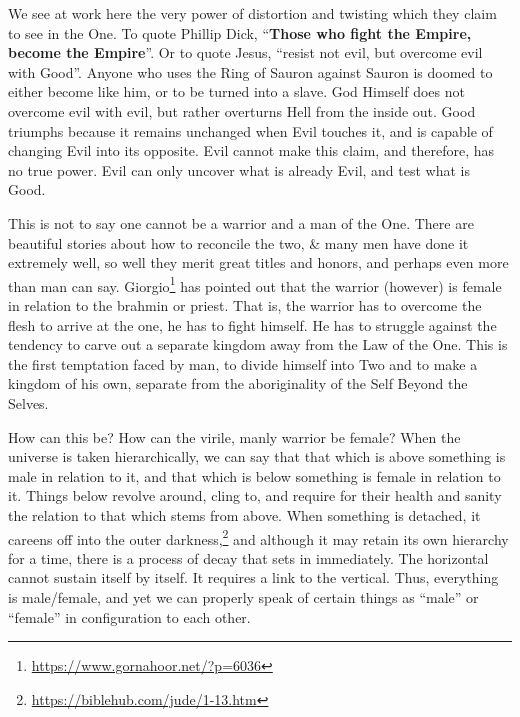 We see at work here the very power of distortion and twisting which they claim to see in the One. To quote Phillip Dick, ``\textbf{Those who fight the Empire, become the Empire}''. Or to quote Jesus, ``resist not evil, but overcome evil with Good''. Anyone who uses the Ring of Sauron against Sauron is doomed to either become like him, or to be turned into a slave. God Himself does not overcome evil with evil, but rather overturns Hell from the inside out. Good triumphs because it remains unchanged when Evil touches it, and is capable of changing Evil into its opposite. Evil cannot make this claim, and therefore, has no true power. Evil can only uncover what is already Evil, and test what is Good.

This is not to say one cannot be a warrior and a man of the One. There are beautiful stories about how to reconcile the two, \& many men have done it extremely well, so well they merit great titles and honors, and perhaps even more than man can say. Giorgio\footnote{\url{https://www.gornahoor.net/?p=6036}} has pointed out that the warrior (however) is female in relation to the brahmin or priest. That is, the warrior has to overcome the flesh to arrive at the one, he has to fight himself. He has to struggle against the tendency to carve out a separate kingdom away from the Law of the One. This is the first temptation faced by man, to divide himself into Two and to make a kingdom of his own, separate from the aboriginality of the Self Beyond the Selves.

How can this be? How can the virile, manly warrior be female? When the universe is taken hierarchically, we can say that that which is above something is male in relation to it, and that which is below something is female in relation to it. Things below revolve around, cling to, and require for their health and sanity the relation to that which stems from above. When something is detached, it careens off into the outer darkness,\footnote{\url{https://biblehub.com/jude/1-13.htm}} and although it may retain its own hierarchy for a time, there is a process of decay that sets in immediately. The horizontal cannot sustain itself by itself. It requires a link to the vertical. Thus, everything is male/female, and yet we can properly speak of certain things as ``male'' or ``female'' in configuration to each other.

